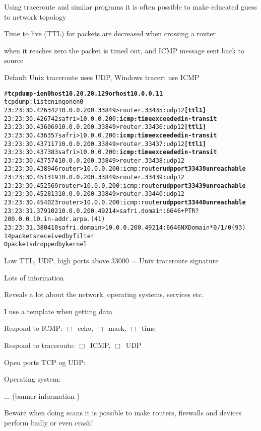 \documentclass[Screen16to9,17pt]{foils}
\begin{document}
\begin{list1}
\item Using traceroute and similar programs it is often possible to make educated guess to network topology
\item Time to live (TTL) for packets are decreased when crossing a router
\item when it reaches zero the packet is timed out, and ICMP message sent back to source
\item Default Unix traceroute uses UDP, Windows tracert use ICMP
\end{list1}



\begin{alltt}
\footnotesize # {\bfseries tcpdump -i en0 host 10.20.20.129 or host 10.0.0.11}
tcpdump: listening on en0
23:23:30.426342 10.0.0.200.33849 > router.33435: udp 12 {\bf [ttl 1]}
23:23:30.426742 safri > 10.0.0.200: {\bf icmp: time exceeded in-transit}
23:23:30.436069 10.0.0.200.33849 > router.33436: udp 12 {\bf [ttl 1]}
23:23:30.436357 safri > 10.0.0.200: {\bf icmp: time exceeded in-transit}
23:23:30.437117 10.0.0.200.33849 > router.33437: udp 12 {\bf [ttl 1]}
23:23:30.437383 safri > 10.0.0.200: {\bf icmp: time exceeded in-transit}
23:23:30.437574 10.0.0.200.33849 > router.33438: udp 12
23:23:30.438946 router > 10.0.0.200: icmp: router {\bf udp port 33438 unreachable}
23:23:30.451319 10.0.0.200.33849 > router.33439: udp 12
23:23:30.452569 router > 10.0.0.200: icmp: router {\bf udp port 33439 unreachable}
23:23:30.452813 10.0.0.200.33849 > router.33440: udp 12
23:23:30.454023 router > 10.0.0.200: icmp: router {\bf udp port 33440 unreachable}
23:23:31.379102 10.0.0.200.49214 > safri.domain:  6646+ PTR?
200.0.0.10.in-addr.arpa. (41)
23:23:31.380410 safri.domain > 10.0.0.200.49214:  6646 NXDomain* 0/1/0 (93)
14 packets received by filter
0 packets dropped by kernel
\end{alltt}

\vskip 5mm
\centerline{Low TTL, UDP, high ports above 33000 = Unix traceroute signature}



\begin{list1}
\item Lots of information
\item Reveals a lot about the network, operating systems, services etc.
\item I use a template when getting data
  \begin{list2}
    \item Respond to ICMP: $\Box$\  echo, $\Box$\ mask, $\Box$\ time
\item Respond to traceroute: $\Box$\ ICMP, $\Box$\ UDP
\item Open ports TCP og UDP:
\item Operating system:
\item ... (banner information )
  \end{list2}
\item Beware when doing scans it is possible to make routers, firewalls and devices perform badly or even crash!
\end{list1}
\end{document}
